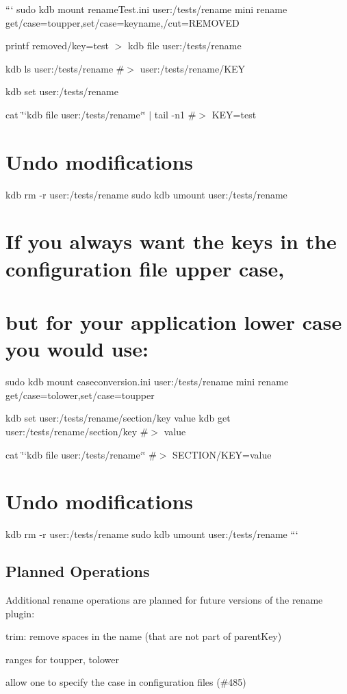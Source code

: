 ``` sudo kdb mount rename\+Test.\+ini user\+:/tests/rename mini rename get/case=toupper,set/case=keyname,/cut=R\+E\+M\+O\+V\+ED

printf \textquotesingle{}removed/key=test\textquotesingle{} $>$ {\ttfamily kdb file user\+:/tests/rename}

kdb ls user\+:/tests/rename \#$>$ user\+:/tests/rename/\+K\+EY

kdb set user\+:/tests/rename

cat \char`\"{}`kdb file user\+:/tests/rename`\char`\"{} $\vert$ tail -\/n1 \#$>$ K\+EY=test\hypertarget{autotoc_md563_autotoc_md574}{}\section{Undo modifications}\label{autotoc_md563_autotoc_md574}
kdb rm -\/r user\+:/tests/rename sudo kdb umount user\+:/tests/rename 
\begin{DoxyCode}
\end{DoxyCode}
 \hypertarget{autotoc_md563_autotoc_md575}{}\section{If you always want the keys in the configuration file upper case,}\label{autotoc_md563_autotoc_md575}
\hypertarget{autotoc_md563_autotoc_md576}{}\section{but for your application lower case you would use\+:}\label{autotoc_md563_autotoc_md576}
sudo kdb mount caseconversion.\+ini user\+:/tests/rename mini rename get/case=tolower,set/case=toupper

kdb set user\+:/tests/rename/section/key value kdb get user\+:/tests/rename/section/key \#$>$ value

cat \char`\"{}`kdb file user\+:/tests/rename`\char`\"{} \#$>$ S\+E\+C\+T\+I\+O\+N/\+K\+EY=value\hypertarget{autotoc_md563_autotoc_md577}{}\section{Undo modifications}\label{autotoc_md563_autotoc_md577}
kdb rm -\/r user\+:/tests/rename sudo kdb umount user\+:/tests/rename ```\hypertarget{autotoc_md563_autotoc_md578}{}\subsection{Planned Operations}\label{autotoc_md563_autotoc_md578}
Additional rename operations are planned for future versions of the rename plugin\+:


\begin{DoxyItemize}
\item trim\+: remove spaces in the name (that are not part of parent\+Key)
\item ranges for toupper, tolower
\item allow one to specify the case in configuration files (\#485) 
\end{DoxyItemize}